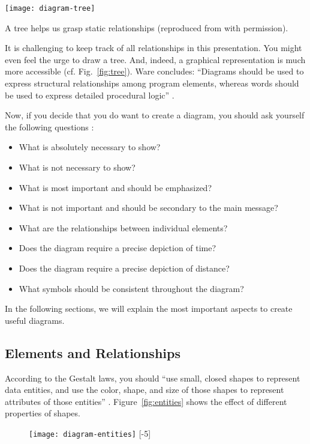 \begin{marginfigure}
\centering
\texttt{[image: diagram-tree]}
\caption{\label{fig:tree} A tree helps us grasp static relationships (reproduced from \cite{Ware12} with permission).}%
\end{marginfigure}

It is challenging to keep track of all relationships in this presentation. You might even feel the urge to draw a tree. And, indeed, a graphical representation is much more accessible (cf. Fig.~\ref{fig:tree}). Ware concludes: ``Diagrams should be used to express structural relationships among program elements, whereas words should be used to express detailed procedural logic'' \cite{Ware12}.


Now, if you decide that you do want to create a diagram, you should ask yourself the following questions \cite{Carter12}:
\begin{itemize}
\item What is absolutely necessary to show?
\item What is not necessary to show?
\item What is most important and should be emphasized?
\item What is not important and should be secondary to the main message?
\item What are the relationships between individual elements?
\item Does the diagram require a precise depiction of time?
\item Does the diagram require a precise depiction of distance?
\item What symbols should be consistent throughout the diagram?
\end{itemize}

In the following sections, we will explain the most important aspects to create useful diagrams.

\subsection{Elements and Relationships}

According to the Gestalt laws, you should
``use small, closed shapes to represent data entities, and use the color, shape, and size of those shapes to represent attributes of those entities'' \cite{Ware12}. Figure~\ref{fig:entities} shows the effect of different properties of shapes.

\begin{figure}[t]
\centering
\texttt{[image: diagram-entities]}
[-5\baselineskip]
\end{figure}

